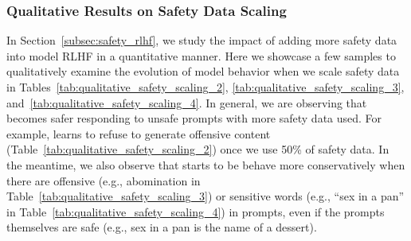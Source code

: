 \subsubsection{Qualitative Results on Safety Data Scaling}
\label{sec:qualitative_results_safety_scaling}

In Section~\ref{subsec:safety_rlhf}, we study the impact of adding more safety data into model RLHF in a quantitative manner. Here we showcase a few samples to qualitatively examine the evolution of model behavior when we scale safety data in Tables~\ref{tab:qualitative_safety_scaling_2}, \ref{tab:qualitative_safety_scaling_3}, and~\ref{tab:qualitative_safety_scaling_4}. In general, we are observing that \modelname becomes safer responding to unsafe prompts with more safety data used. For example, \modelname learns to refuse to generate offensive content (Table~\ref{tab:qualitative_safety_scaling_2}) once we use 50\% of safety data. In the meantime, we also observe that \modelname starts to be behave more conservatively when there are offensive (e.g., abomination in Table~\ref{tab:qualitative_safety_scaling_3}) or sensitive words (e.g., ``sex in a pan'' in Table~\ref{tab:qualitative_safety_scaling_4}) in prompts, even if the prompts themselves are safe (e.g., sex in a pan is the name of a dessert).


